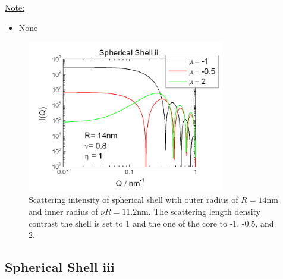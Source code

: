 \noindent\underline{Note:}
\begin{itemize}
\item[~] None
\end{itemize}

\begin{figure}[htb]
\begin{center}
\includegraphics[width=0.768\textwidth,height=0.588\textwidth]{../images/form_factor/spheres/shell_ii_P.png}
\end{center}
\caption{Scattering intensity of spherical shell with outer radius of $R=14$nm
and inner radius of $\nu R=11.2$nm. The scattering length density contrast the shell is set to 1
and the one of the core to -1, -0.5, and 2.} \label{fig:I_shell_ii}
\end{figure}

\clearpage
\subsection{Spherical Shell iii}
\label{sect:spherical_shell_iii} ~\\

